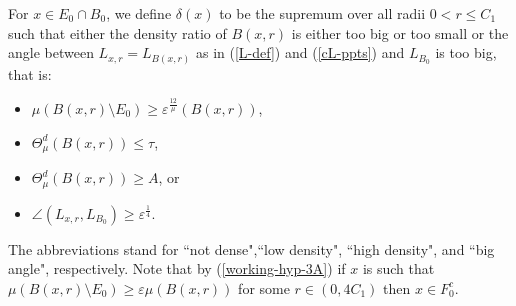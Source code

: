 \documentclass[11pt]{amsart}
\newcommand{\rf}[1]{{(\ref{#1})}}
\newcommand{\ve}{{\varepsilon}}
\newcommand{\wt}[1]{{\widetilde{#1}}}
\newcommand{\HD}{{\mathsf{HD}}}
\newcommand{\LD}{{\mathsf{LD}}}
\theoremstyle{definition}
\theoremstyle{remark}
\def\ND{{\rm ND}}
\def\LD{{\rm LD}}
\def\HD{{\rm HD}}
\def\BA{{\rm BA}}
\numberwithin{equation}{section}
\begin{document}
	



For $x\in E_{0}\cap B_0$, we define $\delta(x)$ to be the supremum over all radii $0<r\leq C_{1}$ such that either
the density ratio of $B(x,r)$ is either too big or too small or the angle between $L_{x,r}=L_{B(x,r)}$ as in \rf{L-def} and \rf{cL-ppts}
and $L_{B_0}$ is too big, that is:
\begin{center}
\begin{itemize}
\item[\ND:] $\mu(B(x,r)\setminus E_{0})\geq\ve^\frac{12} \mu(B(x,r))$,
\item[\LD:] %
	$\Theta_{\mu}^{d}(B(x,r))\leq\tau$,
	\item[\HD:]  %
	$\Theta_{\mu}^{d}(B(x,r))\ge A$, or
	\item[\BA:] %
	$\angle(L_{x,r},L_{B_{0}})\geq\ve^{\frac{1}{4}}$. 

\end{itemize}
\end{center}
\noindent The abbreviations stand for ``not dense",``low density", ``high density", and ``big angle", respectively. Note that by \rf{working-hyp-3A} if $x$ is such that $\mu(B(x,r)\setminus E_{0})\geq\ve \mu(B(x,r))$ for some $r\in (0,4C_1) $ then $x\in F_0^c$.
\end{document}

